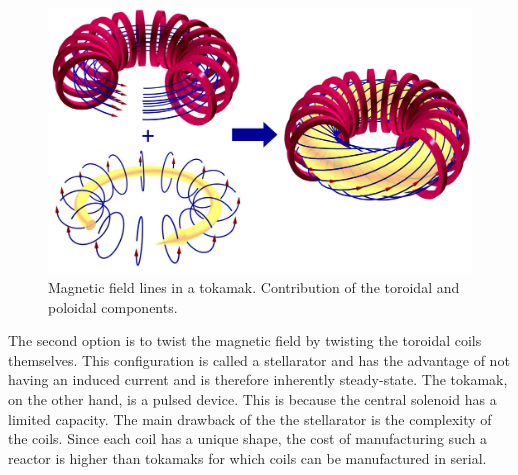 \begin{figure}[h]
    \includegraphics[width=\linewidth]{Figures/Chapter1/tokamak_magnetic_fields.png}
    \caption{Magnetic field lines in a tokamak. Contribution of the toroidal and poloidal components.}
    \label{fig:tokamak magnetic field}
\end{figure}

The second option is to twist the magnetic field by twisting the toroidal coils themselves.
This configuration is called a stellarator and has the advantage of not having an induced current and is therefore inherently steady-state.
The tokamak, on the other hand, is a pulsed device.
This is because the central solenoid has a limited capacity.
The main drawback of the the stellarator is the complexity of the coils.
Since each coil has a unique shape, the cost of manufacturing such a reactor is higher than tokamaks for which coils can be manufactured in serial.

